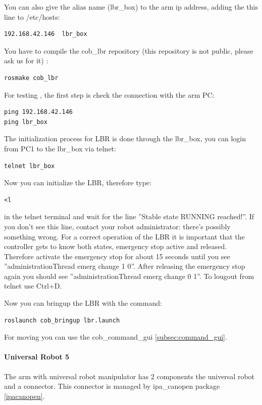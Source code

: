 You can also give the alias name (lbr\_box) to the arm ip address, adding the this line to /etc/hosts:
\begin{lstlisting}
192.168.42.146  lbr_box
\end{lstlisting}

You have to compile the cob\_lbr repository (this repository is not public, please ask us for it) :
\begin{lstlisting}
rosmake cob_lbr
\end{lstlisting}

For testing , the first step is check the connection with the arm PC:
\begin{lstlisting}
ping 192.168.42.146
ping lbr_box
\end{lstlisting}

The initialization process for LBR is done through the lbr\_box, you can login from PC1 to the lbr\_box via telnet:
\begin{lstlisting}
telnet lbr_box
\end{lstlisting}

Now you can initialize the LBR, therefore type: 
\begin{lstlisting}
<l
\end{lstlisting}

in the telnet terminal and wait for the line ”Stable state RUNNING reached!”. If you don’t see this line, contact your robot administrator: there’s possibly something wrong.
For a correct operation of the LBR it is important that the controller gets to know both states, emergency stop active and released. Therefore activate the emergency stop for about 15 seconds until you see ”administrationThread emerg change 1 0”. After releasing the emergency stop again you should see ”administrationThread emerg change 0 1”.
To lougout from telnet use Ctrl+D.

Now you can bringup the LBR with the command:
\begin{lstlisting}
roslaunch cob_bringup lbr.launch
\end{lstlisting}

For moving you can use the cob\_command\_gui \ref{subsec:command_gui}.

\paragraph{Universal Robot 5}

The arm with universal robot manipulator has 2 components the universal robot and a connector. This connector is managed by ipa\_canopen package \ref{ipacanopen}.

